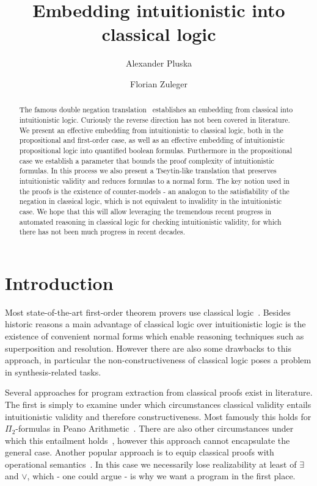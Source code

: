 \documentclass[a4paper,UKenglish,cleveref, autoref, thm-restate]{lipics-v2021}
\title{Embedding intuitionistic into classical logic} %
\author{Alexander {Pluska}}{Faculty of Mathematics, Universtät Wien, Austria}{e11941874@student.tuwien.ac.at}{https://orcid.org/my-orcid?orcid=0000-0002-7709-3335}{}%
\author{Florian Zuleger}{Institute of Logic and Computation, Technische Universität Wien, Austria}{florian.zuleger@tuwien.ac.at}{https://orcid.org/0000-0003-1468-8398}{}
\begin{document}
\maketitle

\begin{abstract}
The famous double negation translation~\cite{glivenko1929quelques, godel1933intuitionistischen} establishes an embedding from classical into intuitionistic logic. Curiously the reverse direction has not been covered in literature. We present an effective embedding from intuitionistic to classical logic, both in the propositional and first-order case, as well as an effective embedding of intuitionistic propositional logic into quantified boolean formulas. 
Furthermore in the propositional case we establish a parameter that bounds the proof complexity of intuitionistic formulas. In this process we also present a Tseytin-like translation that preserves intuitionistic validity and reduces formulas to a normal form. The key notion used in the proofs is the existence of counter-models - an analogon to the satisfiability of the negation in classical logic, which is not equivalent to invalidity in the intuitionistic case.  We hope that this will allow leveraging the tremendous recent progress in automated reasoning in classical logic for checking intuitionistic validity, for which there has not been much progress in recent decades.
\end{abstract}

\section{Introduction}

Most state-of-the-art first-order theorem provers use classical logic~\cite{kovacs2013first, schulz2002brainiac, korovin2008iprover}. Besides historic reasons a main advantage of classical logic over intuitionistic logic is the existence of convenient normal forms which enable reasoning techniques such as superposition and resolution. However there are also some drawbacks to this approach, in particular the non-constructiveness of classical logic poses a problem in synthesis-related tasks.

Several approaches for program extraction from classical proofs exist in literature. The first is simply to examine under which circumstances classical validity entails intuitionistic validity and therefore constructiveness. Most famously this holds for $\Pi_2$-formulas in Peano Arithmetic~\cite{friedman1978classically}. There are also other circumstances under which this entailment holds~\cite{schwichtenberg}, however this approach cannot encapsulate the general case. Another popular approach is to equip classical proofs with operational semantics~\cite{Control1, Parigot1}. In this case we necessarily lose realizability at least of $\exists$ and $\vee$, which - one could argue - is why we want a program in the first place.
\end{document}
